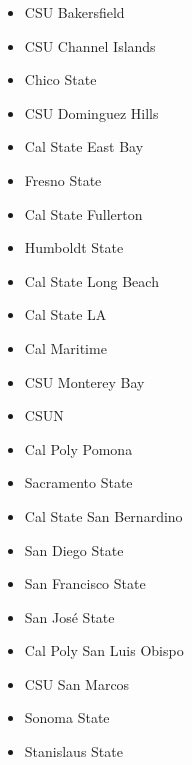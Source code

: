 \begin{itemize}
\item CSU Bakersfield
\item CSU Channel Islands
\item Chico State
\item CSU Dominguez Hills
\item Cal State East Bay
\item Fresno State
\item Cal State Fullerton
\item Humboldt State
\item Cal State Long Beach
\item Cal State LA
\item Cal Maritime
\item CSU Monterey Bay
\item CSUN
\item Cal Poly Pomona
\item Sacramento State
\item Cal State San Bernardino
\item San Diego State
\item San Francisco State
\item San José State
\item Cal Poly San Luis Obispo
\item CSU San Marcos
\item Sonoma State
\item Stanislaus State
\end{itemize}

\begin{subappendices}
\end{subappendices}

